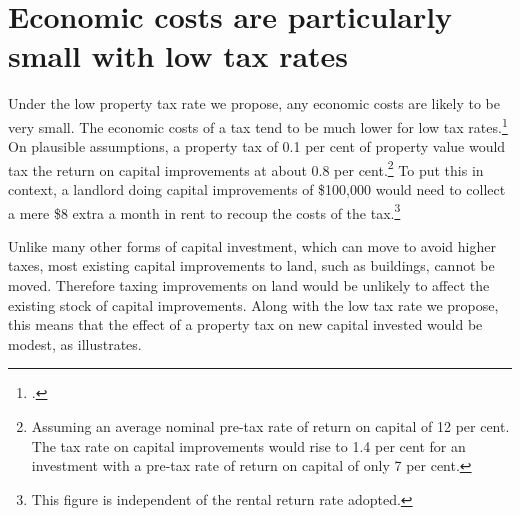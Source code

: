 \section{\label{sec:PROP-4-3}Economic costs are particularly small with low tax rates}
Under the low property tax rate we propose, any economic costs are likely to be very small. The economic costs of a tax tend to be much lower for low tax rates.\footcite[][18]{KPMGEconotech2011-GST}  On plausible assumptions, a property tax of 0.1 per cent of property value would tax the return on capital improvements at about 0.8 per cent.\footnote{Assuming an average nominal pre-tax rate of return on capital of 12 per cent. The tax rate on capital improvements would rise to 1.4 per cent for an investment with a pre-tax rate of return on capital of only 7 per cent.}  To put this in context, a landlord doing capital improvements of \$100,000 would need to collect a mere \$8 extra a month in rent to recoup the costs of the tax.\footnote{This figure is independent of the rental return rate adopted.}

Unlike many other forms of capital investment, which can move to avoid higher taxes, most existing capital improvements to land, such as buildings, cannot be moved. Therefore taxing improvements on land would be unlikely to affect the existing stock of capital improvements. Along with the low tax rate we propose, this means that the effect of a property tax on new capital invested would be modest, as  illustrates.  

